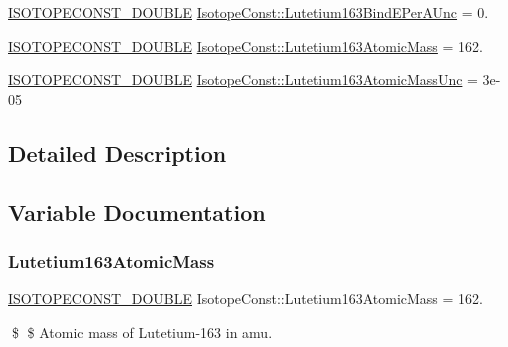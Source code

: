 \begin{DoxyCompactItemize}
\mbox{\hyperlink{group___isotope_const-_macros_ga8f45a7272ce02c0b4c65c44636ed719a}{I\+S\+O\+T\+O\+P\+E\+C\+O\+N\+S\+T\+\_\+\+D\+O\+U\+B\+LE}} \mbox{\hyperlink{group___isotope_const-_lutetium-_lu163_ga910d01a2ce91c0ed61751c299855698e}{Isotope\+Const\+::\+Lutetium163\+Bind\+E\+Per\+A\+Unc}} = 0.
\item 
\mbox{\hyperlink{group___isotope_const-_macros_ga8f45a7272ce02c0b4c65c44636ed719a}{I\+S\+O\+T\+O\+P\+E\+C\+O\+N\+S\+T\+\_\+\+D\+O\+U\+B\+LE}} \mbox{\hyperlink{group___isotope_const-_lutetium-_lu163_gab6bc677532d59459eb529aac672e9380}{Isotope\+Const\+::\+Lutetium163\+Atomic\+Mass}} = 162.
\item 
\mbox{\hyperlink{group___isotope_const-_macros_ga8f45a7272ce02c0b4c65c44636ed719a}{I\+S\+O\+T\+O\+P\+E\+C\+O\+N\+S\+T\+\_\+\+D\+O\+U\+B\+LE}} \mbox{\hyperlink{group___isotope_const-_lutetium-_lu163_ga81880f0208ea634ea5755389cce8838a}{Isotope\+Const\+::\+Lutetium163\+Atomic\+Mass\+Unc}} = 3e-\/05
\end{DoxyCompactItemize}


\subsection{Detailed Description}


\subsection{Variable Documentation}
\mbox{\label{group___isotope_const-_lutetium-_lu163_gab6bc677532d59459eb529aac672e9380}} 
\subsubsection{\texorpdfstring{Lutetium163\+Atomic\+Mass}{Lutetium163AtomicMass}}
{\footnotesize\ttfamily \mbox{\hyperlink{group___isotope_const-_macros_ga8f45a7272ce02c0b4c65c44636ed719a}{I\+S\+O\+T\+O\+P\+E\+C\+O\+N\+S\+T\+\_\+\+D\+O\+U\+B\+LE}} Isotope\+Const\+::\+Lutetium163\+Atomic\+Mass = 162.}

\$ \$ Atomic mass of Lutetium-\/163 in amu. \mbox{\label{group___isotope_const-_lutetium-_lu163_ga81880f0208ea634ea5755389cce8838a}} 
